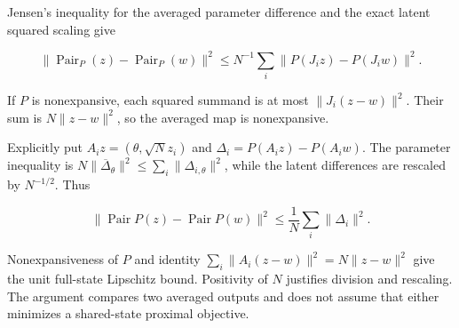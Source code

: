 \documentclass[11pt,a4paper]{report}
\begin{document}
Jensen’s inequality for the averaged parameter difference and the exact latent squared scaling give

\[\|\operatorname{Pair}_P(z)-\operatorname{Pair}_P(w)\|^2\le N^{-1}\sum_i\|P(J_i z)-P(J_i w)\|^2.\]

If \(P\) is nonexpansive, each squared summand is at most \(\|J_i(z-w)\|^2\). Their sum is \(N\|z-w\|^2\), so the averaged map is nonexpansive.



Explicitly put \(A_i z=(\theta,\sqrt N z_i)\) and \(\Delta_i=P(A_i z)-P(A_i w)\). The parameter inequality is \(N\|\overline\Delta_\theta\|^2\le\sum_i\|\Delta_{i,\theta}\|^2\), while the latent differences are rescaled by \(N^{-1/2}\). Thus

\[\|\operatorname{Pair}P(z)-\operatorname{Pair}P(w)\|^2\le\frac1N\sum_i\|\Delta_i\|^2.\]

Nonexpansiveness of \(P\) and identity \(\sum_i\|A_i(z-w)\|^2=N\|z-w\|^2\) give the unit full-state Lipschitz bound. Positivity of \(N\) justifies division and rescaling. The argument compares two averaged outputs and does not assume that either minimizes a shared-state proximal objective.
\end{document}
